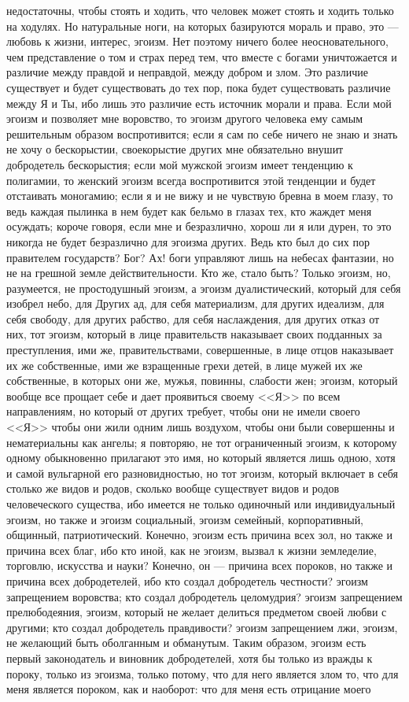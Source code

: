 \documentclass[12pt]{article}
\begin{document}
недостаточны, чтобы стоять и ходить, что человек может стоять и ходить только на ходулях. Но натуральные ноги, на которых базируются мораль и право, это --- любовь к жизни, интерес, эгоизм. Нет поэтому ничего более неосновательного, чем представление о том и страх перед тем, что вместе с богами уничтожается и различие между правдой и неправдой, между добром и злом. Это различие существует и будет существовать до тех пор, пока будет существовать различие между Я и Ты, ибо лишь это различие есть источник морали и права. Если мой эгоизм и позволяет мне воровство, то эгоизм другого человека ему самым решительным образом воспротивится; если я сам по себе ничего не знаю и знать не хочу о бескорыстии, своекорыстие других мне обязательно внушит добродетель бескорыстия; если мой мужской эгоизм имеет тенденцию к полигамии, то женский эгоизм всегда воспротивится этой тенденции и будет отстаивать моногамию; если я и не вижу и не чувствую бревна в моем глазу, то ведь каждая пылинка в нем будет как бельмо в глазах тех, кто жаждет меня осуждать; короче говоря, если мне и безразлично, хорош ли я или дурен, то это никогда не будет безразлично для эгоизма других. Ведь кто был до сих пор правителем государств? Бог? Ах! боги управляют лишь на небесах фантазии, но не на грешной земле действительности. Кто же, стало быть? Только эгоизм, но, разумеется, не простодушный эгоизм, а эгоизм дуалистический, который для себя изобрел небо, для Других ад, для себя материализм, для других идеализм, для себя свободу, для других рабство, для себя наслаждения, для других отказ от них, тот эгоизм, который в лице правительств наказывает своих подданных за преступления, ими же, правительствами, совершенные, в лице отцов наказывает их же собственные, ими же взращенные грехи детей, в лице мужей их же собственные, в которых они же, мужья, повинны, слабости жен; эгоизм, который вообще все прощает себе и дает проявиться своему <<Я>> по всем направлениям, но который от других требует, чтобы они не имели своего <<Я>>  чтобы они жили одним лишь воздухом, чтобы они были совершенны и нематериальны как ангелы; я повторяю, не тот ограниченный эгоизм, к которому одному обыкновенно прилагают это имя, но который является лишь одною, хотя и самой вульгарной его разновидностью, но тот эгоизм, который включает в себя столько же видов и родов, сколько вообще существует видов и родов человеческого существа, ибо имеется не только одиночный или индивидуальный эгоизм, но также и эгоизм социальный, эгоизм семейный, корпоративный, общинный, патриотический. Конечно, эгоизм есть причина всех зол, но также и причина всех благ, ибо кто иной, как не эгоизм, вызвал к жизни земледелие, торговлю, искусства и науки? Конечно, он --- причина всех пороков, но также и причина всех добродетелей, ибо кто создал добродетель честности? эгоизм запрещением воровства; кто создал добродетель целомудрия? эгоизм запрещением прелюбодеяния, эгоизм, который не желает делиться предметом своей любви с другими; кто создал добродетель правдивости? эгоизм запрещением лжи, эгоизм, не желающий быть оболганным и обманутым. Таким образом, эгоизм есть первый законодатель и виновник добродетелей, хотя бы только из вражды к пороку, только из эгоизма, только потому, что для него является злом то, что для меня является пороком, как и наоборот: что для меня есть отрицание моего 
\end{document}
